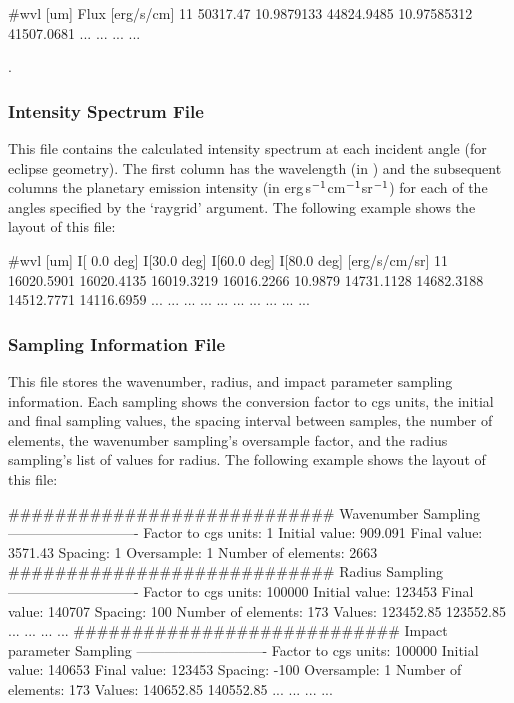 \documentclass[letterpaper, 12pt]{article}
\begin{document}
\begin{plain}
#wvl [um]      Flux [erg/s/cm]
11             50317.47          
10.9879133     44824.9485        
10.97585312    41507.0681        
    ...           ...
    ...           ...
\end{plain} 
\phantom{.\\}%
.

\subsubsection{Intensity Spectrum File}

This file contains the calculated intensity spectrum at each incident
angle (for eclipse geometry).  The first column has the wavelength (in
{\microns}) and the subsequent columns the planetary emission
intensity (in erg\,s$\sp{-1}$cm$\sp{-1}$sr$\sp{-1}$) for each of the
angles specified by the `{\tttb raygrid}' argument.  The following
example shows the layout of this file:

\begin{plain}
#wvl [um]  I[ 0.0 deg]  I[30.0 deg]  I[60.0 deg]  I[80.0 deg]  [erg/s/cm/sr]
11         16020.5901   16020.4135   16019.3219   16016.2266          
10.9879    14731.1128   14682.3188   14512.7771   14116.6959         
    ...       ...           ...         ...           ...      
    ...       ...           ...         ...           ...      
\end{plain}  
\phantom{.\\}  %

\subsubsection{Sampling Information File}

This file stores the wavenumber, radius, and impact parameter sampling
information.  Each sampling shows the conversion factor to cgs units,
the initial and final sampling values, the spacing interval between
samples, the number of elements, the wavenumber sampling's oversample
factor, and the radius sampling's list of values for radius.  The
following example shows the layout of this file:
\begin{plain}
############################
   Wavenumber   Sampling
----------------------------
Factor to cgs units: 1
Initial value: 909.091
Final value: 3571.43
Spacing: 1
Oversample: 1
Number of elements: 2663
############################
   Radius       Sampling
----------------------------
Factor to cgs units: 100000
Initial value: 123453
Final value: 140707
Spacing: 100
Number of elements: 173
Values:     123452.85    123552.85    
              ...          ...
              ...          ...
############################
   Impact parameter Sampling
----------------------------
Factor to cgs units: 100000
Initial value: 140653
Final value: 123453
Spacing: -100
Oversample: 1
Number of elements: 173
Values:     140652.85    140552.85
              ...          ...
              ...          ...    
\end{plain}
\phantom{.\\}  %
\end{document}
